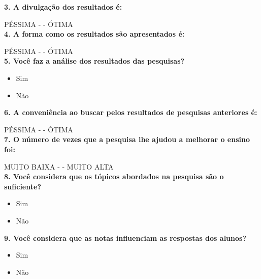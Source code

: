 \documentclass[
  12pt,       %
  openright,      %
  oneside,      %
  a4paper,      %
  english,      %
  french,        %
  spanish,     %
  brazil        %
  ]{abntex2-decsi}
\begin{document}
\begin{apendicesenv}
        \textbf{3. A divulgação dos resultados é:}
        
        PÉSSIMA -      - ÓTIMA\\
        
        \textbf{4. A forma como os resultados são apresentados é:}
        
        PÉSSIMA -      - ÓTIMA\\
        
        \textbf{5. Você faz a análise dos resultados das pesquisas?}
        
            \begin{itemize}[label=\Circle]            
            \item Sim
            \item Não                  
            \end{itemize}
        
        \textbf{6. A conveniência ao buscar pelos resultados de pesquisas anteriores é:}
        
        PÉSSIMA -      - ÓTIMA\\
        
        \textbf{7. O número de vezes que a pesquisa lhe ajudou a melhorar o ensino foi:}
        
        MUITO BAIXA -      - MUITO ALTA\\
        
        \textbf{8. Você considera que os tópicos abordados na pesquisa são o suficiente?}
        
            \begin{itemize}[label=\Circle]           
            \item Sim
            \item Não                  
            \end{itemize}
        
        \textbf{9. Você considera que as notas influenciam as respostas dos alunos?}
        
            \begin{itemize}[label=\Circle]        
            \item Sim
            \item Não       
            \end{itemize}
        

\end{apendicesenv}
\end{document}
